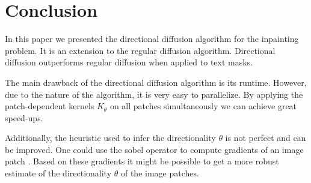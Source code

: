 \section{Conclusion}
\label{sec:conclusion}

In this paper we presented the directional diffusion algorithm for the inpainting problem. It is an extension to the regular diffusion algorithm. Directional diffusion outperforms regular diffusion when applied to text masks.

The main drawback of the directional diffusion algorithm is its runtime. However, due to the nature of the algorithm, it is very easy to parallelize. By applying the patch-dependent kernels $K_\theta$ on all patches simultaneously we can achieve great speed-ups.

Additionally, the heuristic used to infer the directionality $\theta$ is not perfect and can be improved. One could use the sobel operator to compute gradients of an image patch \cite{sobel2014history}. Based on these gradients it might be possible to get a more robust estimate of the directionality $\theta$ of the image patches. 


